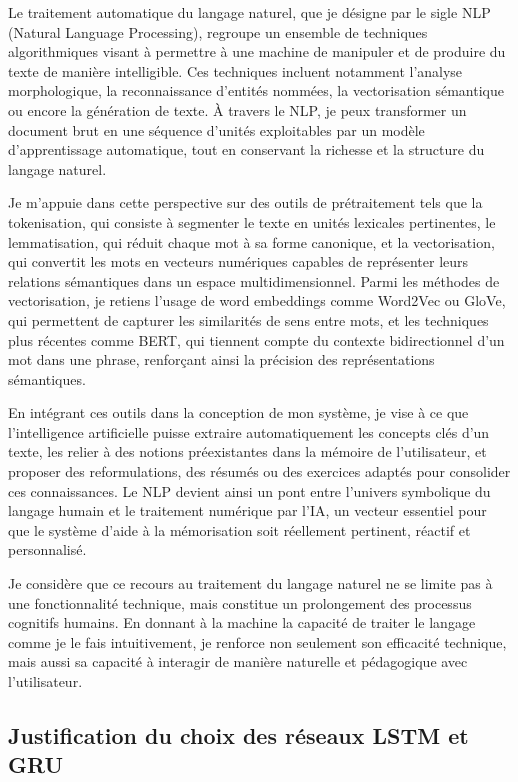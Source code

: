 \documentclass[11pt,a4paper]{report}
\begin{document}
Le traitement automatique du langage naturel, que je désigne par le sigle NLP (Natural Language Processing), regroupe un ensemble de techniques algorithmiques visant à permettre à une machine de manipuler et de produire du texte de manière intelligible. Ces techniques incluent notamment l’analyse morphologique, la reconnaissance d’entités nommées, la vectorisation sémantique ou encore la génération de texte. À travers le NLP, je peux transformer un document brut en une séquence d’unités exploitables par un modèle d’apprentissage automatique, tout en conservant la richesse et la structure du langage naturel.

Je m’appuie dans cette perspective sur des outils de prétraitement tels que la tokenisation, qui consiste à segmenter le texte en unités lexicales pertinentes, le lemmatisation, qui réduit chaque mot à sa forme canonique, et la vectorisation, qui convertit les mots en vecteurs numériques capables de représenter leurs relations sémantiques dans un espace multidimensionnel. Parmi les méthodes de vectorisation, je retiens l’usage de word embeddings comme Word2Vec ou GloVe, qui permettent de capturer les similarités de sens entre mots, et les techniques plus récentes comme BERT, qui tiennent compte du contexte bidirectionnel d’un mot dans une phrase, renforçant ainsi la précision des représentations sémantiques.

En intégrant ces outils dans la conception de mon système, je vise à ce que l’intelligence artificielle puisse extraire automatiquement les concepts clés d’un texte, les relier à des notions préexistantes dans la mémoire de l’utilisateur, et proposer des reformulations, des résumés ou des exercices adaptés pour consolider ces connaissances. Le NLP devient ainsi un pont entre l’univers symbolique du langage humain et le traitement numérique par l’IA, un vecteur essentiel pour que le système d’aide à la mémorisation soit réellement pertinent, réactif et personnalisé.

Je considère que ce recours au traitement du langage naturel ne se limite pas à une fonctionnalité technique, mais constitue un prolongement des processus cognitifs humains. En donnant à la machine la capacité de traiter le langage comme je le fais intuitivement, je renforce non seulement son efficacité technique, mais aussi sa capacité à interagir de manière naturelle et pédagogique avec l’utilisateur.

\subsection{Justification du choix des réseaux LSTM et GRU}
\end{document}
